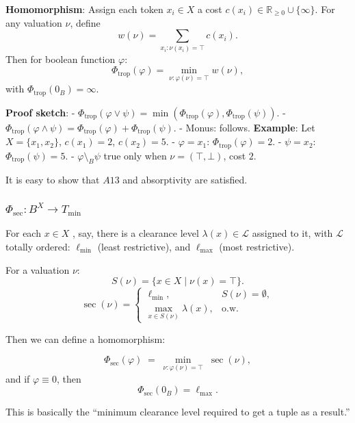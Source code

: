 \textbf{Homomorphism}:\newline
Assign each token \(x_i\in X\) a cost \(c(x_i)\in\mathbb{R}_{\ge0}\cup\{\infty\}\). For any valuation \(\nu\), define
$$
w(\nu) = \sum_{x_i:\nu(x_i)=\top} c(x_i).
$$
Then for boolean function  \(\varphi\):
$$
\Phi_{\mathrm{trop}}(\varphi) 
= \min_{\nu:\varphi(\nu)=\top} w(\nu),
$$
with \(\Phi_{\mathrm{trop}}(0_B)=\infty\).
\newline

\textbf{Proof sketch}: \newline
- \(\Phi_{\mathrm{trop}}(\varphi \vee \psi) = \min(\Phi_{\mathrm{trop}}(\varphi), \Phi_{\mathrm{trop}}(\psi))\).  
- \(\Phi_{\mathrm{trop}}(\varphi \wedge \psi) = \Phi_{\mathrm{trop}}(\varphi) + \Phi_{\mathrm{trop}}(\psi)\).  
- Monus: follows. \newline
\textbf{Example}: \newline
Let \(X=\{x_1,x_2\}\), \(c(x_1)=2\), \(c(x_2)=5\).  
- \(\varphi = x_1\): \(\Phi_{\mathrm{trop}}(\varphi)=2\).  
- \(\psi = x_2\): \(\Phi_{\mathrm{trop}}(\psi)=5\).  
- \(\varphi \setminus_B \psi\) true only when \(\nu=(\top,\bot)\), cost \(2\).

It is easy to show that $A13$ and absorptivity are satisfied.


\subsubsection{$\Phi_{\mathrm{sec}}: B^X \to T_{\min}$}

For each \(x\in X\) , say, there is a clearance level \(\lambda(x)\in \mathcal L\) assigned to it,
with \(\mathcal L\) totally ordered: \(\ell_{\min}\) (least restrictive),
and \(\ell_{\max}\) (most restrictive).

For a valuation \(\nu\):
\[
S(\nu) = \{x\in X \mid \nu(x)=\top\}.
\]
\[
\sec(\nu) =
\begin{cases}
\ell_{\min}, & S(\nu)=\emptyset,\\
\max_{x\in S(\nu)} \lambda(x), & \text{o.w.}
\end{cases}
\]



Then we can define a homomorphism:

\[
\Phi_{\mathrm{sec}}(\varphi)
\;=\;
\min_{\nu:\varphi(\nu)=\top}\;\sec(\nu),
\]
and if \(\varphi\equiv 0\), then
\[
\Phi_{\mathrm{sec}}(0_B) = \ell_{\max}.
\]

This is basically the “minimum clearance level required to get a tuple as a result.”



